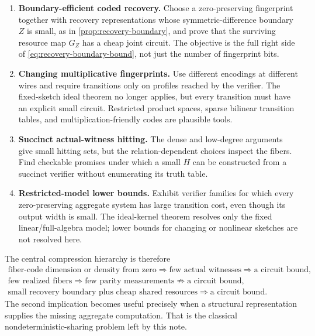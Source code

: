 \documentclass[11pt]{article}
\theoremstyle{definition}
\theoremstyle{remark}
\begin{document}
\begin{enumerate}[label=\textbf{\arabic*.},leftmargin=2.2em]
\item \textbf{Boundary-efficient coded recovery.}
Choose a zero-preserving fingerprint together with recovery representations
whose symmetric-difference boundary $Z$ is small, as in
\cref{prop:recovery-boundary}, and prove that the surviving resource map
$G_Z$ has a cheap joint circuit.  The objective is the full right side of
\eqref{eq:recovery-boundary-bound}, not just the number of fingerprint bits.

\item \textbf{Changing multiplicative fingerprints.}
Use different encodings at different wires and require transitions only on
profiles reached by the verifier.  The fixed-sketch ideal theorem no longer
applies, but every transition must have an explicit small circuit.  Restricted
product spaces, sparse bilinear transition tables, and
multiplication-friendly codes are plausible tools.

\item \textbf{Succinct actual-witness hitting.}
The dense and low-degree arguments give small hitting sets, but the
relation-dependent choices inspect the fibers.  Find checkable promises under
which a small $H$ can be constructed from a succinct verifier without
enumerating its truth table.

\item \textbf{Restricted-model lower bounds.}
Exhibit verifier families for which every zero-preserving aggregate system has
large transition cost, even though its output width is small.  The
ideal-kernel theorem resolves only the fixed linear/full-algebra model; lower
bounds for changing or nonlinear sketches are not resolved here.
\end{enumerate}

The central compression hierarchy is therefore
\[
\boxed{
\begin{array}{c}
\text{fiber-code dimension or density from zero}\Rightarrow
\text{few actual witnesses}\Rightarrow\text{a circuit bound},\\[0.35em]
\text{few realized fibers}\Rightarrow
\text{few parity measurements}\not\Rightarrow\text{a circuit bound},\\[0.35em]
\text{small recovery boundary plus cheap shared resources}
\Rightarrow\text{a circuit bound}.
\end{array}}
\tag{9.1}\label{eq:hierarchy}
\]
The second implication becomes useful precisely when a structural
representation supplies the missing aggregate computation.  That is the
classical nondeterministic-sharing problem left by this note.
\end{document}
